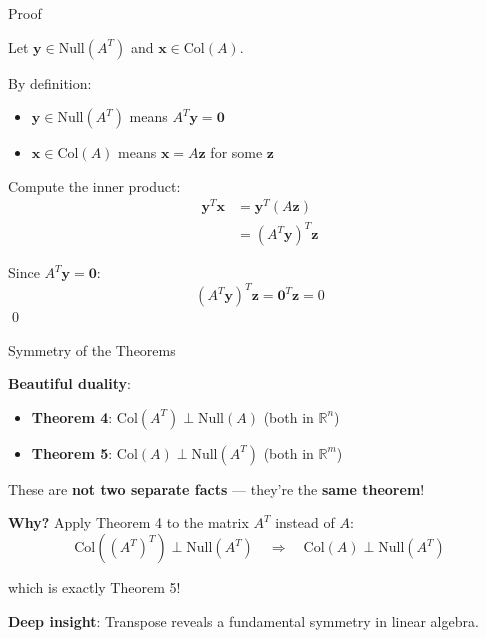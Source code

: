 \documentclass[10pt]{beamer}
\theoremstyle{definition}
\newcommand{\x}[1]{\alert{\textbf{#1}}}
\begin{document}
\begin{frame}{Proof}

Let $\mathbf{y} \in \text{Null}(A^T)$ and $\mathbf{x} \in \text{Col}(A)$.

\vspace{1em}

By definition:
\begin{itemize}
\item $\mathbf{y} \in \text{Null}(A^T)$ means $A^T \mathbf{y} = \mathbf{0}$
\item $\mathbf{x} \in \text{Col}(A)$ means $\mathbf{x} = A\mathbf{z}$ for some $\mathbf{z}$
\end{itemize}

\vspace{1em}

Compute the inner product:
\begin{align*}
\mathbf{y}^T \mathbf{x} &= \mathbf{y}^T (A\mathbf{z}) \\
&= (A^T \mathbf{y})^T \mathbf{z}
\end{align*}

Since $A^T \mathbf{y} = \mathbf{0}$:
$$(A^T \mathbf{y})^T \mathbf{z} = \mathbf{0}^T \mathbf{z} = 0$$ \qed

\end{frame}

\begin{frame}{Symmetry of the Theorems}

\x{Beautiful duality}:

\vspace{1em}

\begin{itemize}
\item \textbf{Theorem 4}: $\text{Col}(A^T) \perp \text{Null}(A)$ (both in $\mathbb{R}^n$)
\item \textbf{Theorem 5}: $\text{Col}(A) \perp \text{Null}(A^T)$ (both in $\mathbb{R}^m$)
\end{itemize}

\vspace{1em}

These are \x{not two separate facts} — they're the \x{same theorem}!

\vspace{1em}

\x{Why?} Apply Theorem 4 to the matrix $A^T$ instead of $A$:
$$\text{Col}((A^T)^T) \perp \text{Null}(A^T) \quad \Rightarrow \quad \text{Col}(A) \perp \text{Null}(A^T)$$

which is exactly Theorem 5!

\vspace{1em}

\x{Deep insight}: Transpose reveals a fundamental symmetry in linear algebra.

\end{frame}
\end{document}
